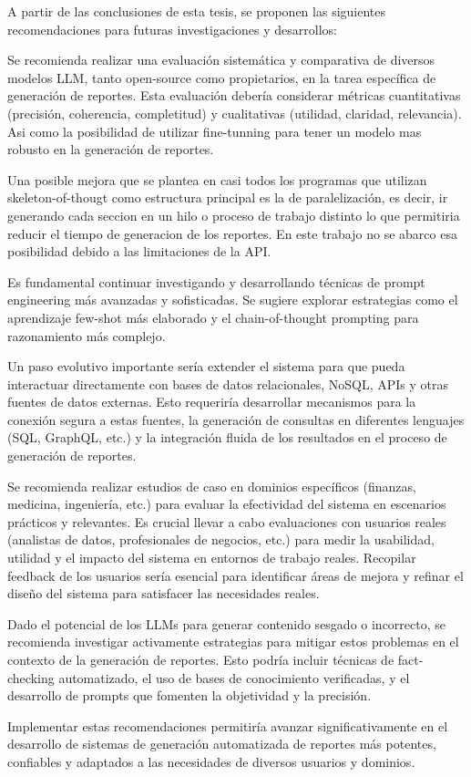 \begin{recomendations}
    A partir de las conclusiones de esta tesis, se proponen las siguientes recomendaciones para futuras investigaciones y desarrollos:
    
    Se recomienda realizar una evaluación sistemática y comparativa de diversos modelos LLM, tanto open-source como propietarios, en la tarea específica de generación de reportes. Esta evaluación debería considerar métricas cuantitativas (precisión, coherencia, completitud) y cualitativas (utilidad, claridad, relevancia). Asi como la posibilidad de utilizar fine-tunning para tener un modelo mas robusto en la generación de reportes.
    
    Una posible mejora que se plantea en casi todos los programas que  utilizan skeleton-of-thougt como estructura principal es la de paralelización, es decir, ir generando cada seccion en un hilo o proceso de trabajo distinto lo que permitiria reducir el tiempo de generacion de los reportes. En este trabajo no se abarco esa posibilidad debido a las limitaciones de la API.
    
    Es fundamental continuar investigando y desarrollando técnicas de prompt engineering más avanzadas y sofisticadas. Se sugiere explorar estrategias como el aprendizaje few-shot más elaborado y el chain-of-thought prompting para razonamiento más complejo.

    Un paso evolutivo importante sería extender el sistema para que pueda interactuar directamente con bases de datos relacionales, NoSQL, APIs y otras fuentes de datos externas. Esto requeriría desarrollar mecanismos para la conexión segura a estas fuentes, la generación de consultas en diferentes lenguajes (SQL, GraphQL, etc.) y la integración fluida de los resultados en el proceso de generación de reportes.
    
    Se recomienda realizar estudios de caso en dominios específicos (finanzas, medicina, ingeniería, etc.) para evaluar la efectividad del sistema en escenarios prácticos y relevantes. Es crucial llevar a cabo evaluaciones con usuarios reales (analistas de datos, profesionales de negocios, etc.) para medir la usabilidad, utilidad y el impacto del sistema en entornos de trabajo reales. Recopilar feedback de los usuarios sería esencial para identificar áreas de mejora y refinar el diseño del sistema para satisfacer las necesidades reales.
    
    Dado el potencial de los LLMs para generar contenido sesgado o incorrecto, se recomienda investigar activamente estrategias para mitigar estos problemas en el contexto de la generación de reportes. Esto podría incluir técnicas de fact-checking automatizado, el uso de bases de conocimiento verificadas, y el desarrollo de prompts que fomenten la objetividad y la precisión.
    
    Implementar estas recomendaciones permitiría avanzar significativamente en el desarrollo de sistemas de generación automatizada de reportes más potentes, confiables y adaptados a las necesidades de diversos usuarios y dominios.
\end{recomendations}
